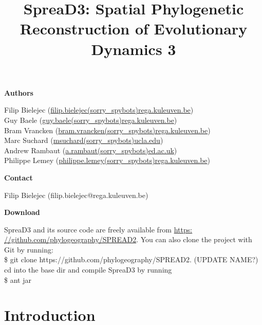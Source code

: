 \documentclass[english]{paper}
\def \spreadname {SpreaD3}
\begin{document}
\title{{\spreadname}: Spatial Phylogenetic Reconstruction of Evolutionary Dynamics 3}
\maketitle

\begin{flushleft}
\textbf{Authors}
\par\end{flushleft}

\noindent
Filip Bielejec (\url{filip.bielejec(sorry_spybots)rega.kuleuven.be}) \\
Guy Baele (\url{guy.baele(sorry_spybots)rega.kuleuven.be}) \\
Bram Vrancken  (\url{bram.vrancken(sorry_spybots)rega.kuleuven.be}) \\
Marc Suchard (\url{msuchard(sorry_spybots)ucla.edu})\\
Andrew Rambaut (\url{a.rambaut(sorry_spybots)ed.ac.uk}) \\
Philippe Lemey (\url{philippe.lemey(sorry_spybots)rega.kuleuven.be}) \\

\begin{flushleft}
\textbf{Contact}
\par\end{flushleft}
Filip Bielejec (filip.bielejec@rega.kuleuven.be) 


\begin{flushleft}
\textbf{Download}
\par\end{flushleft}
SpreaD3 and its source code are freely available from \url{https: //github.com/phylogeography/SPREAD2}.
You can also clone the project with Git by running: 
\\\$ git clone https://github.com/phylogeography/SPREAD2. (UPDATE NAME?)
\\
cd into the base dir and compile SpreaD3 by running 
\\\$ ant jar

\pagebreak{}
\tableofcontents{}
\pagebreak{}

\section{Introduction}
\end{document}
